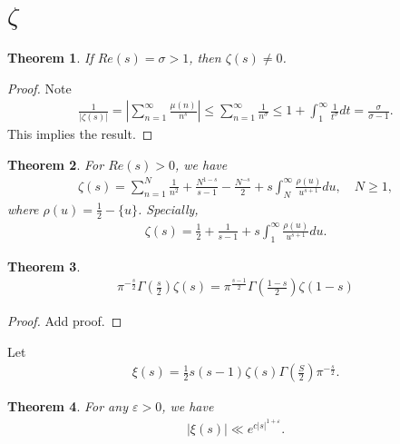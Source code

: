 \documentclass[a4paper,10pt]{amsart}
\newtheorem{theorem}{Theorem}[section]
\begin{document}
\section{$\zeta$}

\begin{theorem}
    If $Re(s) = \sigma > 1$, then $\zeta(s) \neq 0$.
\end{theorem}

\begin{proof}
    Note 
   \begin{align*}
       \frac{1}{|\zeta(s)|} = |\sum^{\infty}_{n=1} \frac{\mu(n)}{n^{s}}|
       \leq \sum^{\infty}_{n=1}\frac{1}{n^{\sigma}} \leq 
       1 + \int^{\infty}_{1} \frac{1}{t^{\sigma}} dt 
       = \frac{\sigma}{\sigma-1}.
   \end{align*}
   This implies the result. 
\end{proof}

\begin{theorem}
    For $Re(s) > 0$, we have
   \begin{align*}
       \zeta(s) = \sum^{N}_{n=1}\frac{1}{n^{2}} + \frac{N^{1-s}}{s-1} 
       -\frac{N^{-s}}{2} + s \int^{\infty}_{N} \frac{\rho(u)}{u^{s+1}}d u,
       \quad N \geq 1,
   \end{align*}
   where $\rho(u) = \frac{1}{2} - \{u\}$.
   Specially, 
   \begin{align*}
       \zeta(s) = \frac{1}{2} + \frac{1}{s-1} 
       + s \int^{\infty}_{1} \frac{\rho(u)}{u^{s+1}}d u.
   \end{align*}

\end{theorem}

\begin{theorem}
\begin{align*}
\pi^{-\frac{s}{2}} \Gamma(\frac{s}{2})\zeta(s) =  
\pi^{\frac{s-1}{2}} \Gamma(\frac{1-s}{2})\zeta(1-s)
\end{align*}
\end{theorem}

\begin{proof}
   Add proof. 
\end{proof}

Let 
\begin{align*}
    \xi(s) = \frac{1}{2}
    s(s-1)\zeta(s)\Gamma(\frac{S}{2})\pi^{-\frac{s}{2}}.  
\end{align*}

\begin{theorem}
For any $\varepsilon > 0$, we have
\begin{align*}
    |\xi(s)|  \ll e^{c|s|^{1+\varepsilon}}. 
\end{align*}
\end{theorem}
\end{document}
